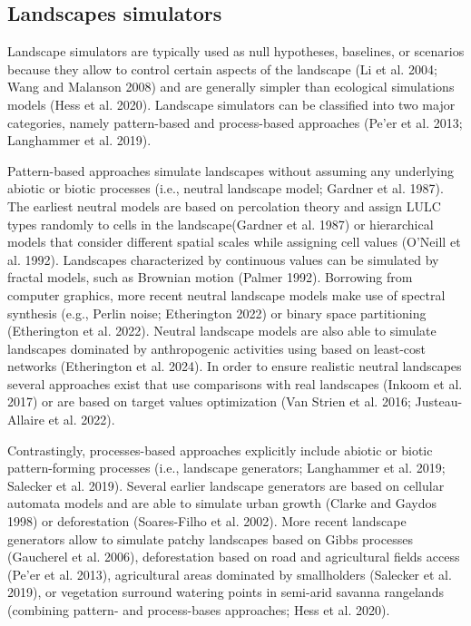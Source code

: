 \documentclass[
  10pt,
  a4paperpaper,
]{article}
\begin{document}
\subsection{Landscapes simulators}\label{landscapes-simulators}

Landscape simulators are typically used as null hypotheses, baselines,
or scenarios because they allow to control certain aspects of the
landscape (Li et al. 2004; Wang and Malanson 2008) and are generally
simpler than ecological simulations models (Hess et al. 2020). Landscape
simulators can be classified into two major categories, namely
pattern-based and process-based approaches (Pe'er et al. 2013;
Langhammer et al. 2019).

Pattern-based approaches simulate landscapes without assuming any
underlying abiotic or biotic processes (i.e., neutral landscape model;
Gardner et al. 1987). The earliest neutral models are based on
percolation theory and assign LULC types randomly to cells in the
landscape(Gardner et al. 1987) or hierarchical models that consider
different spatial scales while assigning cell values (O'Neill et al.
1992). Landscapes characterized by continuous values can be simulated by
fractal models, such as Brownian motion (Palmer 1992). Borrowing from
computer graphics, more recent neutral landscape models make use of
spectral synthesis (e.g., Perlin noise; Etherington 2022) or binary
space partitioning (Etherington et al. 2022). Neutral landscape models
are also able to simulate landscapes dominated by anthropogenic
activities using based on least-cost networks (Etherington et al. 2024).
In order to ensure realistic neutral landscapes several approaches exist
that use comparisons with real landscapes (Inkoom et al. 2017) or are
based on target values optimization (Van Strien et al. 2016;
Justeau-Allaire et al. 2022).

Contrastingly, processes-based approaches explicitly include abiotic or
biotic pattern-forming processes (i.e., landscape generators; Langhammer
et al. 2019; Salecker et al. 2019). Several earlier landscape generators
are based on cellular automata models and are able to simulate urban
growth (Clarke and Gaydos 1998) or deforestation (Soares-Filho et al.
2002). More recent landscape generators allow to simulate patchy
landscapes based on Gibbs processes (Gaucherel et al. 2006),
deforestation based on road and agricultural fields access (Pe'er et al.
2013), agricultural areas dominated by smallholders (Salecker et al.
2019), or vegetation surround watering points in semi-arid savanna
rangelands (combining pattern- and process-bases approaches; Hess et al.
2020).
\end{document}

